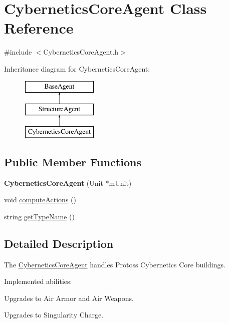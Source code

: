 \hypertarget{class_cybernetics_core_agent}{
\section{CyberneticsCoreAgent Class Reference}
\label{class_cybernetics_core_agent}
}


{\ttfamily \#include $<$CyberneticsCoreAgent.h$>$}

Inheritance diagram for CyberneticsCoreAgent:\begin{figure}[H]
\begin{center}
\leavevmode
\includegraphics[height=3.000000cm]{class_cybernetics_core_agent}
\end{center}
\end{figure}
\subsection*{Public Member Functions}
\begin{DoxyCompactItemize}
\item 
\hypertarget{class_cybernetics_core_agent_aa60c5b20ac2661c12c4e0c78f7512135}{
{\bfseries CyberneticsCoreAgent} (Unit $\ast$mUnit)}
\label{class_cybernetics_core_agent_aa60c5b20ac2661c12c4e0c78f7512135}

\item 
void \hyperlink{class_cybernetics_core_agent_a92b5d0191784801fa1cb5a2a2ad46d43}{computeActions} ()
\item 
string \hyperlink{class_cybernetics_core_agent_a4545821a1dddb5710473bdfe91ca630a}{getTypeName} ()
\end{DoxyCompactItemize}


\subsection{Detailed Description}
The \hyperlink{class_cybernetics_core_agent}{CyberneticsCoreAgent} handles Protoss Cybernetics Core buildings.

Implemented abilities:
\begin{DoxyItemize}
\item Upgrades to Air Armor and Air Weapons.
\item Upgrades to Singularity Charge.
\end{DoxyItemize}

